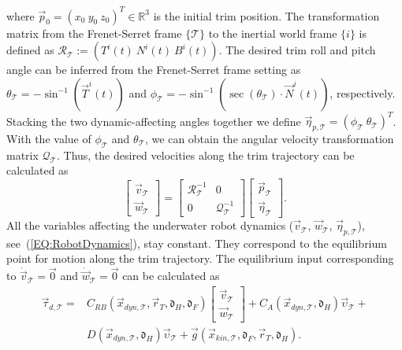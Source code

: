 where $\vec{p}_{0}=(x_{0}~y_{0}~z_{0})^{T} \in \mathbb{R}^{3}$ is the initial trim position.
The transformation matrix from the Frenet-Serret frame $\lbrace \mathcal{T} \rbrace$ to the inertial world frame $\lbrace i \rbrace$ is defined as $
 \mathcal{R}_{\mathcal{T}}:=
 (T^{i}(t)~N^{i}(t)~B^{i}(t))$. The desired trim roll and pitch angle can be inferred from the Frenet-Serret frame setting as $\theta_{\mathcal{T}}=-\sin^{-1}(\vec{T}^{i}(t))$ and $
\phi_{\mathcal{T}}=-\sin^{-1}(\sec(\theta_{\mathcal{T}})\cdot \vec{N}^{i}(t))
$, respectively. Stacking the two dynamic-affecting angles together we define $\vec{\eta}_{p,\mathcal{T}}=(\phi_{\mathcal{T}}~\theta_{\mathcal{T}})^{T}$. With the value of $\phi_{\mathcal{T}}$ and $\theta_{\mathcal{T}}$, we can obtain the angular velocity transformation matrix $\mathcal{Q}_{\mathcal{T}}$. Thus, the desired velocities along the trim trajectory can be calculated as
\begin{equation}
\begin{bmatrix}
\vec{v}_{\mathcal{T}} \\
\vec{w}_{\mathcal{T}}
\end{bmatrix} =
\begin{bmatrix}
\mathcal{R}_{\mathcal{T}}^{-1} & 0\\
0 & \mathcal{Q}_{\mathcal{T}}^{-1} 
\end{bmatrix}
\begin{bmatrix}
\vec{p}_{\mathcal{T}} \\ \vec{\eta}_{\mathcal{T}}
\end{bmatrix}.
\end{equation}
All the variables affecting the underwater robot dynamics ($\vec{v}_{\mathcal{T}}$, $\vec{w}_{\mathcal{T}}$, $\vec{\eta}_{p,\mathcal{T}}$), see~(\ref{EQ:RobotDynamics}), stay constant. They correspond to the equilibrium point for motion along the trim trajectory. The equilibrium input corresponding to $\dot{\vec{v}}_{\mathcal{T}}=\vec{0}$ and $\dot{\vec{w}}_{\mathcal{T}}=\vec{0}$ can be calculated as
\begin{align}
\vec{\tau}_{d,\mathcal{T}}=&C_{RB}(\vec{x}_{dyn,\mathcal{T}},\vec{r}_{T},\mathfrak{d}_{H},\mathfrak{d}_{F})
\begin{bmatrix}
\vec{v}_{\mathcal{T}} \\ \vec{w}_{\mathcal{T}}
\end{bmatrix}
+ 
C_{A}(\vec{x}_{dyn,\mathcal{T}},\mathfrak{d}_{H})\vec{\upsilon}_{\mathcal{T}}+ \nonumber \\ & D(\vec{x}_{dyn,\mathcal{T}},\mathfrak{d}_{H})\vec{\upsilon}_{\mathcal{T}} 
+\vec{g}(\vec{x}_{kin,\mathcal{T}},\mathfrak{d}_{F},\vec{r}_{T},\mathfrak{d}_{H}).
\end{align}
